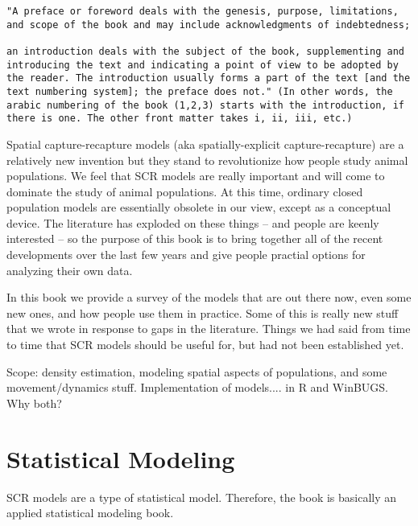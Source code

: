 \begin{verbatim}
"A preface or foreword deals with the genesis, purpose, limitations,
and scope of the book and may include acknowledgments of indebtedness;

an introduction deals with the subject of the book, supplementing and
introducing the text and indicating a point of view to be adopted by
the reader. The introduction usually forms a part of the text [and the
text numbering system]; the preface does not." (In other words, the
arabic numbering of the book (1,2,3) starts with the introduction, if
there is one. The other front matter takes i, ii, iii, etc.)
\end{verbatim}


Spatial capture-recapture models (aka spatially-explicit
capture-recapture) are a relatively new invention but they stand to
revolutionize how people study animal populations. We feel
that SCR models are really important and will come to dominate the
study of animal populations. At this time, ordinary closed population
models are essentially obsolete in our view, except as a conceptual
device. The literature has exploded on these things -- and people are
keenly interested -- so the purpose of this book is to bring together
all of the recent developments over the last few years and give people
practial options for analyzing their own data. 

In this book we
provide a survey of the models that are out there now, even some new
ones, and  how people use them in practice. Some of this is really new
stuff that we wrote in response to gaps in the literature. Things we
had  said from time to time that SCR models should be useful for,
but had not been established yet. 

Scope:
 density estimation, modeling spatial aspects of populations, and some
 movement/dynamics stuff. 
 Implementation of models.... in R and WinBUGS. Why both?


\section{Statistical Modeling}

SCR models are a type of statistical model. Therefore, 
the book is basically an applied statistical modeling book.

